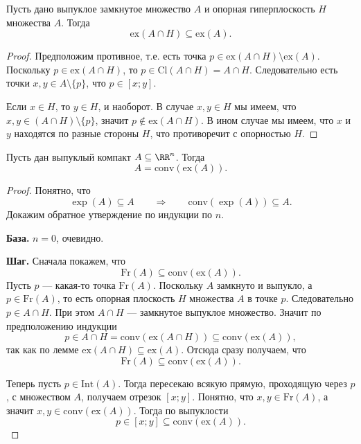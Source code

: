 \documentclass[12pt,a4paper]{article}
\newcommand{\Int}{\ensuremath{\mathrm{Int}}\xspace}
\newcommand{\Cl}{\ensuremath{\mathrm{Cl}}\xspace}
\newcommand{\Fr}{\ensuremath{\mathrm{Fr}}\xspace}
\newcommand{\conv}{\ensuremath{\mathrm{conv}}\xspace}
\newcommand{\ex}{\ensuremath{\mathrm{ex}}\xspace}
\begin{document}
    \begin{lemma}
        Пусть дано выпуклое замкнутое множество $A$ и опорная гиперплоскость $H$ множества $A$. Тогда
        \[\ex(A \cap H) \subseteq \ex(A).\]
    \end{lemma}

    \begin{proof}
        Предположим противное, т.е. есть точка $p \in \ex(A \cap H) \setminus \ex(A)$. Поскольку $p \in \ex(A \cap H)$, то $p \in \Cl(A \cap H) = A \cap H$. Следовательно есть точки $x, y \in A \setminus \{p\}$, что $p \in [x; y]$.

        Если $x \in H$, то $y \in H$, и наоборот. В случае $x, y \in H$ мы имеем, что $x, y \in (A \cap H) \setminus \{p\}$, значит $p \notin \ex(A \cap H)$. В ином случае мы имеем, что $x$ и $y$ находятся по разные стороны $H$, что противоречит с опорностью $H$.
    \end{proof}

    \begin{theorem}\label{Krein–Milman-theorem}
        Пусть дан выпуклый компакт $A \subseteq \RR^n$. Тогда
        \[A = \conv(\ex(A)).\]
    \end{theorem}

    \begin{proof}
        Понятно, что
        \[\exp(A) \subseteq A \qquad \Longrightarrow \qquad \conv(\exp(A)) \subseteq A.\]
        Докажим обратное утверждение по индукции по $n$.

        \textbf{База.} $n=0$, очевидно.

        \textbf{Шаг.} Сначала покажем, что
        \[\Fr(A) \subseteq \conv(\ex(A)).\]
        Пусть $p$ --- какая-то точка $\Fr(A)$. Поскольку $A$ замкнуто и выпукло, а $p \in \Fr(A)$, то есть опорная плоскость $H$ множества $A$ в точке $p$. Следовательно $p \in A \cap H$. При этом $A \cap H$ --- замкнутое выпуклое множество. Значит по предположению индукции
        \[p \in A \cap H = \conv(\ex(A \cap H)) \subseteq \conv(\ex(A)),\]
        так как по лемме $\ex(A \cap H) \subseteq \ex(A)$. Отсюда сразу получаем, что
        \[\Fr(A) \subseteq \conv(\ex(A)).\]

        Теперь пусть $p \in \Int(A)$. Тогда пересекаю всякую прямую, проходящую через $p$, с множеством $A$, получаем отрезок $[x; y]$. Понятно, что $x, y \in \Fr(A)$, а значит $x, y \in \conv(\ex(A))$. Тогда по выпуклости
        \[p \in [x; y] \subseteq \conv(\ex(A)).\]
    \end{proof}
\end{document}
